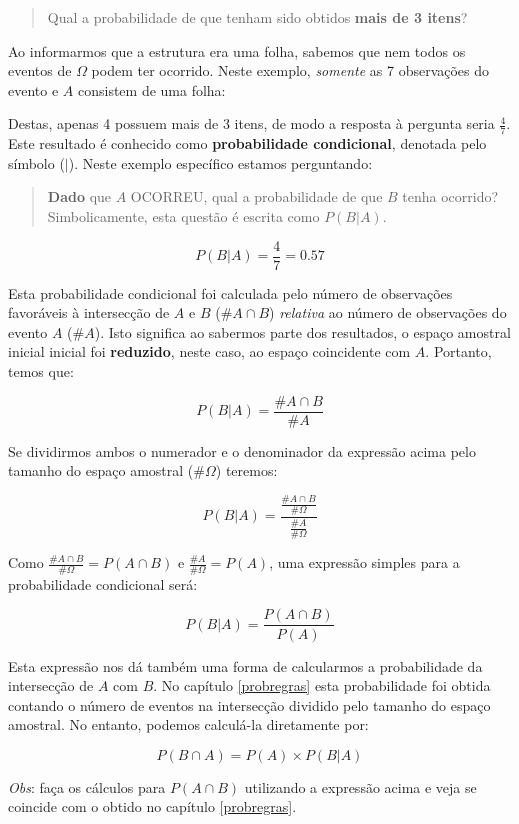 \documentclass[
]{book}
\begin{document}
\begin{quote}
Qual a probabilidade de que tenham sido obtidos \textbf{mais de 3 itens}?
\end{quote}

Ao informarmos que a estrutura era uma folha, sabemos que nem todos os eventos de \(\Omega\) podem ter ocorrido. Neste exemplo, \emph{somente} as 7 observações do evento e \(A\) consistem de uma folha:

Destas, apenas 4 possuem mais de 3 itens, de modo a resposta à pergunta seria \(\frac{4}{7}\). Este resultado é conhecido como \textbf{probabilidade condicional}, denotada pelo símbolo (\(|\)). Neste exemplo específico estamos perguntando:

\begin{quote}
\textbf{Dado} que \(A\) OCORREU, qual a probabilidade de que \(B\) tenha ocorrido? Simbolicamente, esta questão é escrita como \(P(B|A)\).
\end{quote}

\[P(B|A) = \frac{4}{7} = 0.57\]

Esta probabilidade condicional foi calculada pelo número de observações favoráveis à intersecção de \(A\) e \(B\) (\(\#A \cap B\)) \emph{relativa} ao número de observações do evento \(A\) (\(\#A\)). Isto significa ao sabermos parte dos resultados, o espaço amostral inicial inicial foi \textbf{reduzido}, neste caso, ao espaço coincidente com \(A\). Portanto, temos que:

\[P(B|A) = \frac{\#A \cap B}{\#A}\]

Se dividirmos ambos o numerador e o denominador da expressão acima pelo tamanho do espaço amostral (\(\#\Omega\)) teremos:

\[P(B|A) = \frac{\frac{\#A \cap B}{\#\Omega}}{\frac{\#A}{\#\Omega}}\]

Como \(\frac{\#A \cap B}{\#\Omega} = P(A \cap B)\) e \(\frac{\#A}{\#\Omega} = P(A)\), uma expressão simples para a probabilidade condicional será:

\[P(B|A) = \frac{P(A \cap B)}{P(A)}\]

Esta expressão nos dá também uma forma de calcularmos a probabilidade da intersecção de \(A\) com \(B\). No capítulo \ref{probregras} esta probabilidade foi obtida contando o número de eventos na intersecção dividido pelo tamanho do espaço amostral. No entanto, podemos calculá-la diretamente por:

\[P(B \cap A) = P(A) \times P(B|A)\]

\emph{Obs}: faça os cálculos para \(P(A \cap B)\) utilizando a expressão acima e veja se coincide com o obtido no capítulo \ref{probregras}.
\end{document}
